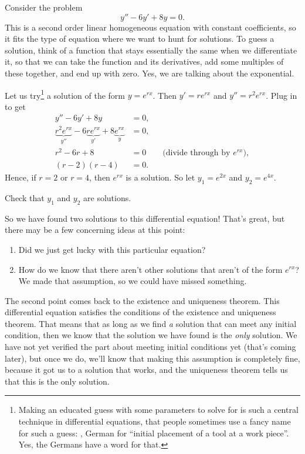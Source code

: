 \documentclass{ximera}
\begin{document}
Consider the problem
\begin{equation*}
    y''-6y'+8y = 0.
\end{equation*}
This is a second order linear homogeneous equation with constant coefficients, so it fits the type of equation where we want to hunt for solutions. To guess a solution, think of a function that stays essentially the same when we differentiate it, so that we can take the function and its derivatives, add some multiples of these together, and end up with zero. Yes, we are talking about the exponential.

Let us try\footnote{%
Making an educated guess with some parameters to solve for is such a central technique in differential equations, that people sometimes use a fancy name for such a guess: \emph{}, German for ``initial placement of a tool at a work piece''.  Yes, the Germans have a word for that.}
a solution of the form $y = e^{rx}$.  Then $y' = r e^{rx}$ and $y'' = r^2 e^{rx}$.  Plug in to get
\begin{align*}
    y''-6y'+8y & = 0 , \\
    \underbrace{r^2 e^{rx}}_{y''} -6 \underbrace{r e^{rx}}_{y'}+8 \underbrace{e^{rx}}_{y} & = 0 , \\
    r^2 -6 r +8 & = 0 \qquad \text{(divide through by } e^{rx} \text{)},\\ 
    (r-2)(r-4) & = 0 .
\end{align*}
Hence, if $r=2$ or $r=4$, then $e^{rx}$ is a solution.  So let $y_1 = e^{2x}$ and $y_2 = e^{4x}$.

\begin{exercise}
    Check that $y_1$ and $y_2$ are solutions.
\end{exercise}

So we have found two solutions to this differential equation! That's great, but there may be a few concerning ideas at this point:
\begin{enumerate}
    \item Did we just get lucky with this particular equation?
    \item How do we know that there aren't other solutions that aren't of the form $e^{rx}$? We made that assumption, so we could have missed something.
\end{enumerate}

The second point comes back to the existence and uniqueness theorem. This differential equation satisfies the conditions of the existence and uniqueness theorem. That means that as long as we find \emph{a} solution that can meet any initial condition, then we know that the solution we have found is the \emph{only} solution. We have not yet verified the part about meeting initial conditions yet (that's coming later), but once we do, we'll know that making this assumption is completely fine, because it got us to a solution that works, and the uniqueness theorem tells us that this is the only solution. 
\end{document}
